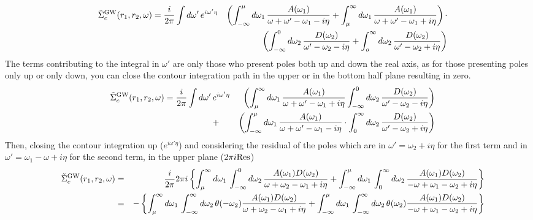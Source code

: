 \documentclass[fleqn]{article}
\begin{document}
\begin{eqnarray*}
  \quad
  \tilde{\Sigma}^{\rm GW}_c(r_1,r_2,\omega) =
  \frac{i}{2 \pi} \int d\omega' \, & e^{i \omega' \eta} & \left( 
    \int_{-\infty}^\mu d\omega_1 \, \frac{A(\omega_1)}{\omega+\omega'-\omega_1-i\eta} +
    \int_\mu^\infty d\omega_1 \, \frac{A(\omega_1)}{\omega+\omega'-\omega_1+i\eta} \right) \cdot
    \\ &&
    \left( \int_{-\infty}^0 d\omega_2 \, \frac{D(\omega_2)}{\omega'-\omega_2-i\eta} +
    \int_o^\infty d\omega_2 \, \frac{D(\omega_2)}{\omega'-\omega_2+i\eta} \right)
\end{eqnarray*}
The terms contributing to the integral in $\omega'$ are only those who present
poles both up and down the real axis, as for those presenting poles only up or only
down, you can close the contour integration path in the upper or in the bottom half plane
resulting in zero.
\begin{eqnarray*}
  \quad
  \tilde{\Sigma}^{\rm GW}_c(r_1,r_2,\omega) =
  \frac{i}{2 \pi} \int d\omega' \, & e^{i \omega' \eta} & 
    \left( \int_\mu^\infty d\omega_1 \, \frac{A(\omega_1)}{\omega+\omega'-\omega_1+i\eta} 
    \int_{-\infty}^0 d\omega_2 \, \frac{D(\omega_2)}{\omega'-\omega_2-i\eta} \right)
    \\ &+&
    \left( \int_{-\infty}^\mu d\omega_1 \, \frac{A(\omega_1)}{\omega+\omega'-\omega_1-i\eta} \cdot
     \int_0^\infty d\omega_2 \, \frac{D(\omega_2)}{\omega'-\omega_2+i\eta} \right)
\end{eqnarray*}
Then, closing the contour integration up ($e^{i \omega' \eta}$)
and considering the residual of the
poles which are in $\omega' = \omega_2 + i \eta$ for the first term
and in $\omega' = \omega_1 - \omega + i \eta$ for the second term,
in the upper plane ($2\pi i {\rm Res}$)
\begin{eqnarray*}
  \quad
  \tilde{\Sigma}^{\rm GW}_c(r_1,r_2,\omega) &=& \frac{i}{2 \pi} 2 \pi i \left\{
  \int^{\infty}_\mu d\omega_1 \, \int_{-\infty}^0 d\omega_2 \,
  \frac{A(\omega_1)D(\omega_2)}{\omega+\omega_2-\omega_1+i\eta} + 
  \int^\mu_{-\infty} d\omega_1 \, \int_0^\infty d\omega_2 \,
  \frac{A(\omega_1)D(\omega_2)}{-\omega+\omega_1-\omega_2+i\eta} \right\}
  \\ &=&
  - \left\{
  \int^{\infty}_{\mu} d\omega_1 \, \int_{-\infty}^\infty d\omega_2 \, \theta(-\omega_2)
  \frac{A(\omega_1)D(\omega_2)}{\omega+\omega_2-\omega_1+i\eta} + 
  \int^\mu_{-\infty} d\omega_1 \, \int_{-\infty}^\infty d\omega_2 \, \theta(\omega_2)
  \frac{A(\omega_1)D(\omega_2)}{-\omega+\omega_1-\omega_2+i\eta} \right\}
\end{eqnarray*}
\end{document}
